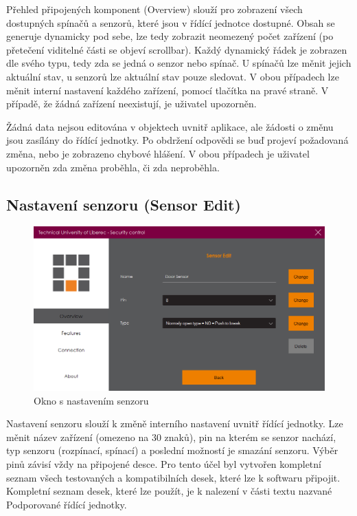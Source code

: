 \documentclass[FM,DP]{tulthesis}  %
\begin{document}
Přehled připojených komponent (Overview) slouží pro zobrazení všech dostupných spínačů a senzorů, které jsou v řídící jednotce dostupné. Obsah se generuje dynamicky pod sebe, lze tedy zobrazit neomezený počet zařízení (po přetečení viditelné části se objeví scrollbar). Každý dynamický řádek je zobrazen dle svého typu, tedy zda se jedná o senzor nebo spínač. U spínačů lze měnit jejich aktuální stav, u senzorů lze aktuální stav pouze sledovat. V obou případech lze měnit interní nastavení každého zařízení, pomocí tlačítka na pravé straně. V případě, že žádná zařízení neexistují, je uživatel upozorněn. 

Žádná data nejsou editována v objektech uvnitř aplikace, ale žádosti o změnu jsou zasílány do řídící jednotky. Po obdržení odpovědi se buď projeví požadovaná změna, nebo je zobrazeno chybové hlášení. V obou případech je uživatel upozorněn zda změna proběhla, či zda neproběhla.

\subsection{Nastavení senzoru (Sensor Edit)}

\begin{figure}[H]
\begin{center}
\includegraphics[width=\textwidth]{images/settings.png}
\caption{Okno s nastavením senzoru}
\label{image}
\end{center}
\end{figure}

Nastavení senzoru slouží k změně interního nastavení uvnitř řídící jednotky. Lze měnit název zařízení (omezeno na 30 znaků), pin na kterém se senzor nachází, typ senzoru (rozpínací, spínací) a poslední možností je smazání senzoru. Výběr pinů závisí vždy na připojené desce. Pro tento účel byl vytvořen kompletní seznam všech testovaných a kompatibilních desek, které lze k softwaru připojit. Kompletní seznam desek, které lze použít, je k nalezení v části textu nazvané Podporované řídící jednotky. 
\end{document}
